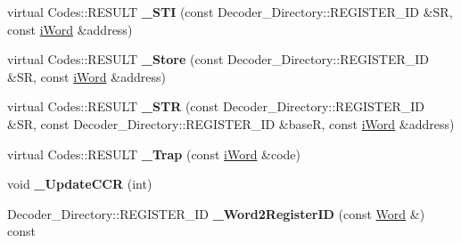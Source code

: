 \begin{DoxyCompactItemize}
\item 
\hypertarget{classWi11_a914c3e753a0182effc6d01f3de4cdd24}{
virtual Codes::RESULT {\bfseries \_\-STI} (const Decoder\_\-Directory::REGISTER\_\-ID \&SR, const \hyperlink{classiWord}{iWord} \&address)}
\label{classWi11_a914c3e753a0182effc6d01f3de4cdd24}

\item 
\hypertarget{classWi11_ac65b835648a3ecdaa76ceaf49141d3d6}{
virtual Codes::RESULT {\bfseries \_\-Store} (const Decoder\_\-Directory::REGISTER\_\-ID \&SR, const \hyperlink{classiWord}{iWord} \&address)}
\label{classWi11_ac65b835648a3ecdaa76ceaf49141d3d6}

\item 
\hypertarget{classWi11_ac623d5c7aac534d1eb774892b82c28ec}{
virtual Codes::RESULT {\bfseries \_\-STR} (const Decoder\_\-Directory::REGISTER\_\-ID \&SR, const Decoder\_\-Directory::REGISTER\_\-ID \&baseR, const \hyperlink{classiWord}{iWord} \&address)}
\label{classWi11_ac623d5c7aac534d1eb774892b82c28ec}

\item 
\hypertarget{classWi11_ac62ce0a9f8df8dacab577cee514cb199}{
virtual Codes::RESULT {\bfseries \_\-Trap} (const \hyperlink{classiWord}{iWord} \&code)}
\label{classWi11_ac62ce0a9f8df8dacab577cee514cb199}

\item 
\hypertarget{classWi11_a55dd619a7cf329849f5a3b22e37d00ed}{
void {\bfseries \_\-UpdateCCR} (int)}
\label{classWi11_a55dd619a7cf329849f5a3b22e37d00ed}

\item 
\hypertarget{classWi11_abba9724054093a987468c0b14bf8fcda}{
Decoder\_\-Directory::REGISTER\_\-ID {\bfseries \_\-Word2RegisterID} (const \hyperlink{classWord}{Word} \&) const }
\label{classWi11_abba9724054093a987468c0b14bf8fcda}

\end{DoxyCompactItemize}
